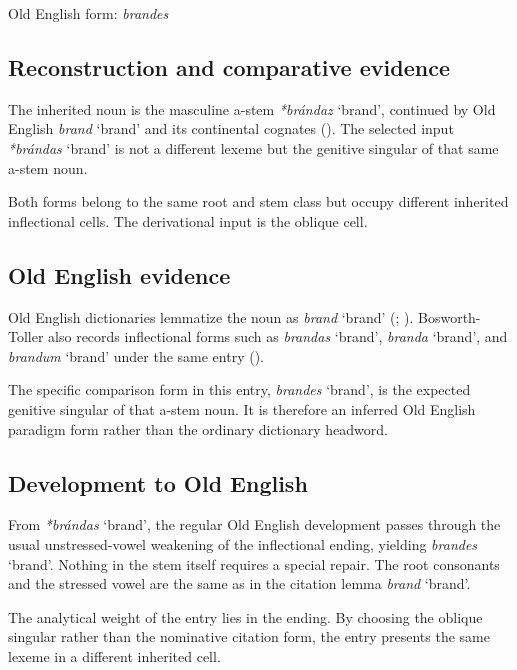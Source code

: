 \documentclass[
  british,
  a4paper,
  openany]{book}
\providecommand{\Recon}[1]{\emph{*#1}}
{\catcode`→=\active \global\def→{\ensuremath{\rightarrow}}}
\providecommand{\Recon}[1]{\emph{*#1}}
{\catcode`→=\active \global\def→{\ensuremath{\rightarrow}}}
\begin{document}
Old English form: \emph{brandes}

\subsection{Reconstruction and comparative
evidence}\label{reconstruction-and-comparative-evidence-75}

The inherited noun is the masculine a-stem {\Recon{brándaz} `brand'},
continued by Old English {\emph{brand}} `brand' and its continental
cognates (). The selected input
{\Recon{brándas} `brand'} is not a different lexeme but the genitive
singular of that same a-stem noun.

Both forms belong to the same root and stem class but occupy different
inherited inflectional cells. The derivational input is the oblique
cell.

\subsection{Old English evidence}\label{old-english-evidence-75}

Old English dictionaries lemmatize the noun as {\emph{brand}} `brand'
(;
).
Bosworth-Toller also records inflectional forms such as {\emph{brandas}}
`brand', {\emph{branda}} `brand', and {\emph{brandum}} `brand' under the
same entry ().

The specific comparison form in this entry, {\emph{brandes}} `brand', is
the expected genitive singular of that a-stem noun. It is therefore an
inferred Old English paradigm form rather than the ordinary dictionary
headword.

\subsection{Development to Old
English}\label{development-to-old-english-75}

From {\Recon{brándas} `brand'}, the regular Old English development
passes through the usual unstressed-vowel weakening of the inflectional
ending, yielding {\emph{brandes}} `brand'. Nothing in the stem itself
requires a special repair. The root consonants and the stressed vowel
are the same as in the citation lemma {\emph{brand}} `brand'.

The analytical weight of the entry lies in the ending. By choosing the
oblique singular rather than the nominative citation form, the entry
presents the same lexeme in a different inherited cell.
\end{document}
